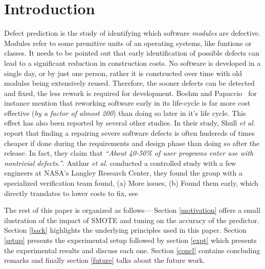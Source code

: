 \documentclass[12pt, journal, compsoc]{IEEEtran}
\begin{document}
\section{Introduction}
Defect prediction is the study of identifying which software \textit{modules} are defective. Modules refer to some premitive units of an operating systems, like funtions or classes. It needs to be pointed out that early identification of possible defects can lead to a significant reduction in construction costs. No software is developed in a single day, or by just one person, rather it is constructed over time with old modules being extensively reused. Therefore, the sooner defects can be detected and fixed, the less rework is required for development. Boehm and Papaccio~\cite{boehm88} for instance mention that reworking software early in its life-cycle is far more cost effective (\textit{by a factor of almost 200}) than doing so later in it's life cycle. This effect has also been reported by several other studies. In their study, Shull \textit{et al.}~\cite{shull2002we} report that finding a repairing severe software defects is often hudereds of times cheaper if done during the requirements and design phase than doing so after the release. In fact, they claim that \textit{``About 40-50\% of user programs enter use with
nontrivial defects.''}. Authur \textit{et al.} \cite{arthur99} conducted a controlled study with a few engineers at NASA's Langley Research Center, they found the group with a specialized verification team found, (a) More issues, (b) Found them early, which directly translates to lower costs to fix, see~\cite{dabney2006predicting.}

The rest of this paper is organized as follows--- Section \ref*{motivation} offers a small ilustration of the impact of SMOTE and tuning on the accuracy of the predictor. Section \ref*{back} highlights the underlying principles used in this paper. Section \ref{setup} presents the experimental setup followed by section \ref{expt} which presents the experimental results and discuss each one. Section \ref{concl} contains concluding remarks and finally section \ref{future} talks about the future work.
\end{document}

